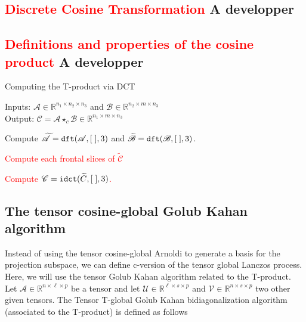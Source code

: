 \documentclass{siamltex}
\newcommand{\1}{\mathbb{1}}
\newcommand{\0}{\mathbb{0}}
\begin{document}
	\subsection{\textcolor{red}{\bf {Discrete Cosine Transformation}}
\Large A developper}
	

	
	
	
	\subsection{\textcolor{red}{\bf {Definitions and properties of the cosine product}}
\Large A developper}	


	
	\begin{algorithm}[!h]
		\caption{Computing the  T-product via DCT}\label{algo1}
		Inputs: $\mathscr {A} \in \mathbb{R}^{n_{1}\times n_{2}\times n_{3}} $ and $\mathscr {B} \in \mathbb{R}^{n_{2}\times m\times n_{3}} $\\
		Output: $\mathscr {C}= \mathscr {A} \star_c \mathscr {B}  \in \mathbb{R}^{n_{1}\times m \times n_{3}} $
		\begin{enumerate}
			\item Compute $\mathscr {\widetilde A}={\tt dft}(\mathscr {A},[ \;],3)$ and $\mathscr {\widetilde B}={\tt dft}(\mathscr {B},[\; ],3)$.
	\textcolor{red}{\bf 	\item Compute each frontal slices of $\mathscr {\widetilde C}$		
			\item Compute $\mathscr {C}={\tt idct}(\widetilde {C},[\;],3)$.	 	}
		\end{enumerate}
	\end{algorithm}
	
	
	


	


	
	
	
	
	\subsection{The tensor cosine-global Golub Kahan algorithm}
	
	\noindent Instead of using the tensor cosine-global Arnoldi to generate a basis for the projection subspace, we can define c-version of the tensor global Lanczos process. Here, we will use the tensor Golub Kahan algorithm related to the T-product. \\
	Let $\mathscr{A} \in \mathbb{R}^{n\times \ell\times p}$  be a tensor and  let  $\mathscr{U}  \in \mathbb{R}^{\ell\times  s \times p}$ and  $\mathscr{V}  \in \mathbb{R}^{n\times  s \times p}$  two other given tensors. The Tensor T-global Golub Kahan bidiagonalization algorithm (associated to the T-product)  is defined as follows
	
\end{document}
